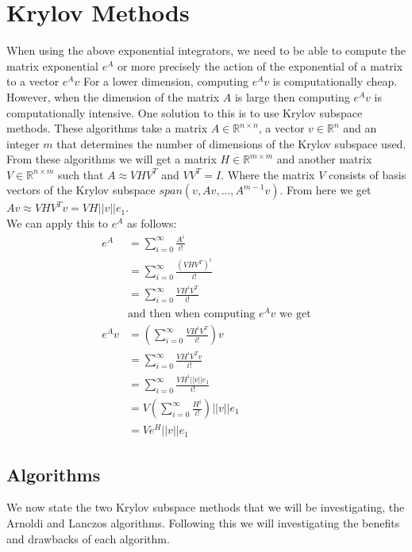 \section{Krylov Methods}
When using the above exponential integrators, we need to be able to compute the matrix exponential $e^{A}$ or more precisely the action of the exponential of a matrix to a vector $e^{A}v$
For a lower dimension, computing $e^{A}v$ is computationally cheap.
However, when the dimension of the matrix $A$ is large then computing $e^{A}v$ is computationally intensive.
One solution to this is to use Krylov subspace methods.
These algorithms take a matrix $A\in \mathbb{R}^{n\times n}$, a vector $v \in \mathbb{R}^n$ and an integer $m$ that determines the number of dimensions of the Krylov subspace used.
From these algorithms we will get a matrix $H \in \mathbb{R}^{m\times m}$ and another matrix $V \in \mathbb{R}^{n\times m}$ such that $A \approx VHV^T$ and $VV^T = I$.
Where the matrix $V$ consists of basis vectors of the Krylov subspace $span(v, Av, ..., A^{m-1}v)$.
From here we get $Av \approx VHV^Tv = VH||v||e_1$.\\
We can apply this to $e^A$ as follows:
\begin{align*}
e^A &= \sum^{\infty}_{i=0}\frac{A^i}{i!}\\
&= \sum^{\infty}_{i=0}\frac{(VHV^T)^i}{i!} \\
&= \sum^{\infty}_{i=0}\frac{VH^iV^T}{i!} \\
&\text {and then when computing $e^Av$ we get}\\
e^Av &= (\sum^{\infty}_{i=0}\frac{VH^iV^T}{i!})v \\
&= \sum^{\infty}_{i=0}\frac{VH^iV^Tv}{i!} \\
&= \sum^{\infty}_{i=0}\frac{VH^i||v||e_1}{i!} \\
&= V(\sum^{\infty}_{i=0}\frac{H^i}{i!})||v||e_1 \\
&= Ve^H||v||e_1
\end{align*}

\subsection{Algorithms}
We now state the two Krylov subspace methods that we will be investigating, the Arnoldi and Lanczos algorithms.
Following this we will investigating the benefits and drawbacks of each algorithm.


